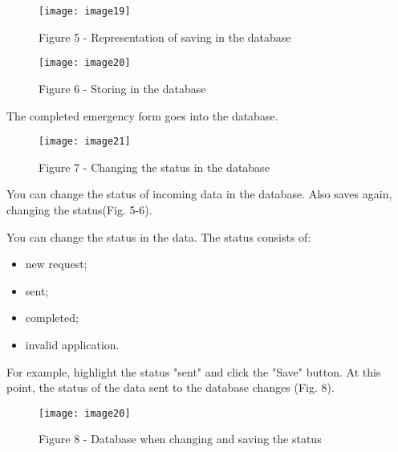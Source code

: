 \begin{figure}[H]
  \centering
  \texttt{[image: image19]}
  \caption*{Figure 5 - Representation of saving in the database}
\end{figure}

\begin{figure}[H]
  \centering
  \texttt{[image: image20]}
  \caption*{Figure 6 - Storing in the database}
\end{figure}

The completed emergency form goes into the database.

\begin{figure}[H]
  \centering
  \texttt{[image: image21]}
  \caption*{Figure 7 - Changing the status in the database}
\end{figure}

\begin{multicols}{2}

You can change the status of incoming data in the database. Also saves
again, changing the status(Fig. 5-6).

You can change the status in the data. The status consists of:

\begin{itemize}
\item
  new request;
\item
  sent;
\item
  completed;
\item
  invalid application.
\end{itemize}

For example, highlight the status "sent" and click the "Save" button. At
this point, the status of the data sent to the database changes (Fig.
8).

\end{multicols}

\begin{figure}[H]
  \centering
  \texttt{[image: image20]}
  \caption*{Figure 8 - Database when changing and saving the status}
\end{figure}

